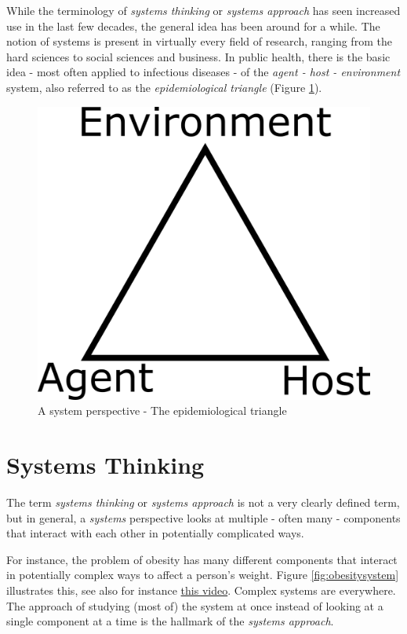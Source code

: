 \documentclass[]{book}
\theoremstyle{definition}
\theoremstyle{definition}
\theoremstyle{definition}
\theoremstyle{remark}
\begin{document}
While the terminology of \emph{systems thinking} or \emph{systems
approach} has seen increased use in the last few decades, the general
idea has been around for a while. The notion of systems is present in
virtually every field of research, ranging from the hard sciences to
social sciences and business. In public health, there is the basic idea
- most often applied to infectious diseases - of the \emph{agent - host
- environment} system, also referred to as the \emph{epidemiological
triangle} (Figure \ref{fig:epitriangle}).

\begin{figure}
\centering
\includegraphics{./images/epi-triangle.png}
\caption{\label{fig:epitriangle}A system perspective - The epidemiological
triangle}
\end{figure}

\section{Systems Thinking}\label{systems-thinking}

The term \emph{systems thinking} or \emph{systems approach} is not a
very clearly defined term, but in general, a \emph{systems} perspective
looks at multiple - often many - components that interact with each
other in potentially complicated ways.

For instance, the problem of obesity has many different components that
interact in potentially complex ways to affect a person's weight. Figure
\ref{fig:obesitysystem} illustrates this, see also for instance
\href{https://youtu.be/2vojPksdbtI}{this video}. Complex systems are
everywhere. The approach of studying (most of) the system at once
instead of looking at a single component at a time is the hallmark of
the \emph{systems approach}.
\end{document}
